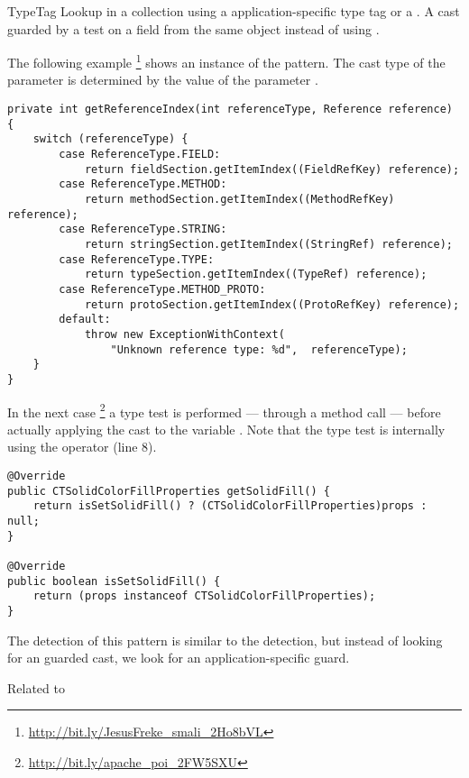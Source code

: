 \begin{pattern}{TypeTag}
Lookup in a collection using a application-specific type tag or a
.
%
%
A cast guarded by a test on a field from the same object instead of
using .

\instances{}
The following example%
\footnote{\url{http://bit.ly/JesusFreke_smali_2Ho8bVL}}
shows an instance of the \thisp{} pattern.
The cast type of the parameter  is determined by the value of the parameter .

\begin{verbatim}
private int getReferenceIndex(int referenceType, Reference reference) {
    switch (referenceType) {
        case ReferenceType.FIELD:
            return fieldSection.getItemIndex((FieldRefKey) reference);
        case ReferenceType.METHOD:
            return methodSection.getItemIndex((MethodRefKey) reference);
        case ReferenceType.STRING:
            return stringSection.getItemIndex((StringRef) reference);
        case ReferenceType.TYPE:
            return typeSection.getItemIndex((TypeRef) reference);
        case ReferenceType.METHOD_PROTO:
            return protoSection.getItemIndex((ProtoRefKey) reference);
        default:
            throw new ExceptionWithContext(
                "Unknown reference type: %d",  referenceType);
    }
}
\end{verbatim}

%
In the next case%
\footnote{\url{http://bit.ly/apache_poi_2FW5SXU}}
a type test is performed --- through a method call --- before actually applying the cast to the variable .
Note that the type test is internally using the  operator (line 8).

\begin{verbatim}
@Override
public CTSolidColorFillProperties getSolidFill() {
    return isSetSolidFill() ? (CTSolidColorFillProperties)props : null;
}

@Override
public boolean isSetSolidFill() {
    return (props instanceof CTSolidColorFillProperties);
}
\end{verbatim}

\detection{}
The detection of this pattern is similar to the  detection, but instead of looking for an  guarded cast, we look for an application-specific guard.

\discussion{}

\related{}
%
Related to 

\end{pattern}